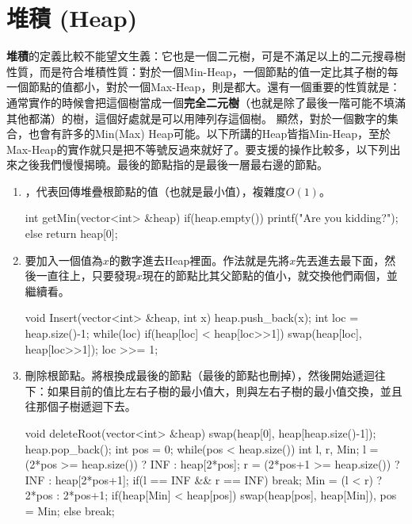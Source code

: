 \documentclass[main.tex]{subfiles}
\begin{document}
\section{堆積 (Heap)}
\textbf{堆積}的定義比較不能望文生義：它也是一個二元樹，可是不滿足以上的二元搜尋樹性質，而是符合堆積性質：對於一個Min-Heap，一個節點的值一定比其子樹的每一個節點的值都小，對於一個Max-Heap，則是都大。還有一個重要的性質就是：通常實作的時候會把這個樹當成一個\textbf{完全二元樹}（也就是除了最後一階可能不填滿其他都滿）的樹，這個好處就是可以用陣列存這個樹。
顯然，對於一個數字的集合，也會有許多的Min(Max) Heap可能。以下所講的Heap皆指Min-Heap，至於Max-Heap的實作就只是把不等號反過來就好了。要支援的操作比較多，以下列出來之後我們慢慢揭曉。最後的節點指的是最後一層最右邊的節點。
\begin{enumerate}
\item {}，代表回傳堆疊根節點的值（也就是最小值），複雜度$O(1)$。
\begin{C++}
int getMin(vector<int> &heap) {
    if(heap.empty())
        printf("Are you kidding?\n");
    else return heap[0];
}
\end{C++}
\item {} 要加入一個值為$x$的數字進去Heap裡面。作法就是先將$x$先丟進去最下面，然後一直往上，只要發現$x$現在的節點比其父節點的值小，就交換他們兩個，並繼續看。
\begin{C++}
void Insert(vector<int> &heap, int x) {
    heap.push_back(x);
    int loc = heap.size()-1;
    while(loc){
        if(heap[loc] < heap[loc>>1])
            swap(heap[loc], heap[loc>>1]);
        loc >>= 1;
    }
}
\end{C++}
\item {} 刪除根節點。將根換成最後的節點（最後的節點也刪掉），然後開始遞迴往下：如果目前的值比左右子樹的最小值大，則與左右子樹的最小值交換，並且往那個子樹遞迴下去。
\begin{C++}
void deleteRoot(vector<int> &heap) {
    swap(heap[0], heap[heap.size()-1]);
    heap.pop_back();
    int pos = 0;
    while(pos < heap.size()) {
        int l, r, Min;
        l = (2*pos >= heap.size()) ?
        	INF : heap[2*pos];
        r = (2*pos+1 >= heap.size()) ?
        	INF : heap[2*pos+1];
        if(l == INF && r == INF) break;
        Min = (l < r) ? 2*pos : 2*pos+1;
        if(heap[Min] < heap[pos])
            swap(heap[pos], heap[Min]), pos = Min;
        else break;
    }
}
\end{C++}
\end{enumerate}
\end{document}
